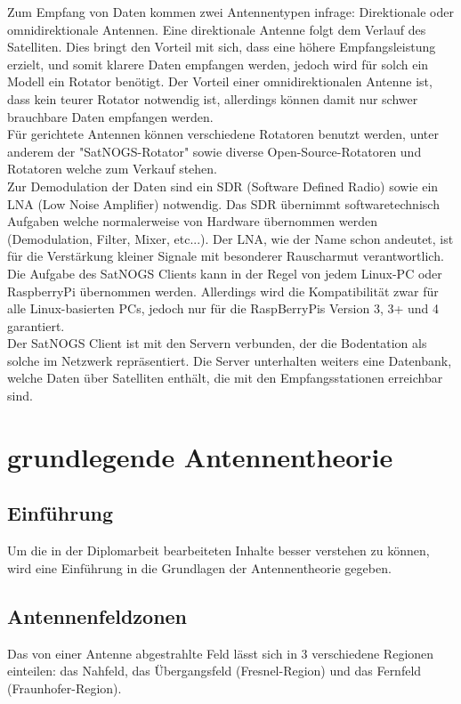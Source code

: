 \documentclass[12pt]{scrreprt}
\begin{document}
	Zum Empfang von Daten kommen zwei Antennentypen infrage: Direktionale oder omnidirektionale Antennen. Eine direktionale Antenne folgt dem Verlauf des Satelliten. Dies bringt den Vorteil mit sich, dass eine höhere Empfangsleistung erzielt, und somit klarere Daten empfangen werden, jedoch wird für solch ein Modell ein Rotator benötigt. Der Vorteil einer omnidirektionalen Antenne ist, dass kein teurer Rotator notwendig ist, allerdings können damit nur schwer brauchbare Daten empfangen werden.\\
	
	Für gerichtete Antennen können verschiedene Rotatoren benutzt werden, unter anderem der "SatNOGS-Rotator" sowie diverse Open-Source-Rotatoren und Rotatoren welche zum Verkauf stehen.\\
	
	Zur Demodulation der Daten sind ein SDR (Software Defined Radio) sowie ein LNA (Low Noise Amplifier) notwendig. Das SDR übernimmt softwaretechnisch Aufgaben welche normalerweise von Hardware übernommen werden (Demodulation, Filter, Mixer, etc...). Der LNA, wie der Name schon andeutet, ist für die Verstärkung kleiner Signale mit besonderer Rauscharmut verantwortlich. \\
	
	Die Aufgabe des SatNOGS Clients kann in der Regel von jedem Linux-PC oder RaspberryPi übernommen werden. Allerdings wird die Kompatibilität zwar für alle Linux-basierten PCs, jedoch nur für die RaspBerryPis Version 3, 3+ und 4 garantiert.\\
	
	Der SatNOGS Client ist mit den Servern verbunden, der die Bodentation als solche im Netzwerk repräsentiert. Die Server unterhalten weiters eine Datenbank, welche Daten über Satelliten enthält, die mit den Empfangsstationen erreichbar sind.
	\pagebreak
	
	\section{grundlegende Antennentheorie}
	\subsection{Einführung}
	Um die in der Diplomarbeit bearbeiteten Inhalte besser verstehen zu können, wird eine Einführung in die Grundlagen der Antennentheorie gegeben. 
	
	\subsection{Antennenfeldzonen}
	Das von einer Antenne abgestrahlte Feld lässt sich in 3 verschiedene Regionen einteilen: das Nahfeld, das Übergangsfeld (Fresnel-Region) und das Fernfeld (Fraunhofer-Region).\\
	
\end{document}
